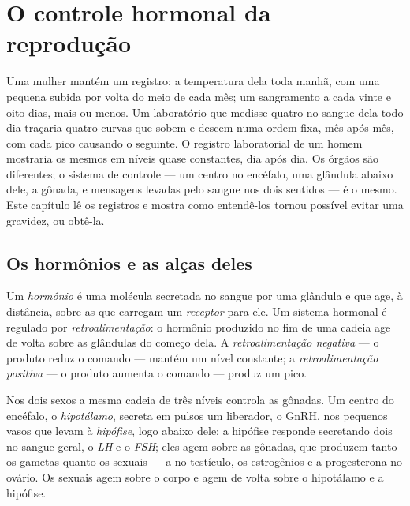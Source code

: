 \chapter{O controle hormonal da reprodução}\label{ch:g11:hormones-and-reproduction}

Uma mulher mantém um registro: a temperatura dela toda manhã, com uma
pequena subida por volta do meio de cada mês; um sangramento a cada
vinte e oito dias, mais ou menos. Um laboratório que medisse quatro
 no sangue dela todo dia traçaria quatro curvas que sobem e
descem numa ordem fixa, mês após mês, com cada pico causando o
seguinte. O registro laboratorial de um homem mostraria os mesmos
 em níveis quase constantes, dia após dia. Os órgãos são
diferentes; o sistema de controle --- um centro no encéfalo, uma
glândula abaixo dele, a gônada, e mensagens levadas pelo sangue nos
dois sentidos --- é o mesmo. Este capítulo lê os registros e mostra
como entendê-los tornou possível evitar uma gravidez, ou obtê-la.

\section{Os hormônios e as alças deles}

\begin{definition}\label{def:g11:hormones-and-reproduction:hormone}
Um \emph{hormônio} é uma molécula secretada no sangue
por uma glândula e que age, à distância, sobre as  que carregam
um \emph{receptor} para ele. Um sistema hormonal é regulado por
\emph{retroalimentação}: o hormônio produzido no
fim de uma cadeia age de volta sobre as glândulas do começo dela. A
\emph{retroalimentação negativa} --- o produto reduz o comando ---
mantém um nível constante; a \emph{retroalimentação positiva} --- o
produto aumenta o comando --- produz um pico.
\end{definition}

\begin{proposition}\label{prop:g11:hormones-and-reproduction:chain}
Nos dois sexos a mesma cadeia de três níveis controla as gônadas. Um
centro do encéfalo, o \emph{hipotálamo}, secreta em pulsos um 
liberador, o GnRH, nos pequenos vasos que levam à
\emph{hipófise}, logo abaixo dele; a hipófise responde secretando dois
 no sangue geral, o \emph{LH} e o \emph{FSH}; eles agem sobre
as gônadas, que produzem tanto os gametas quanto os  sexuais
--- a  no testículo, os estrogênios e a progesterona no
ovário. Os  sexuais agem sobre o corpo e agem de volta sobre o
hipotálamo e a hipófise.
\end{proposition}
\admitted

